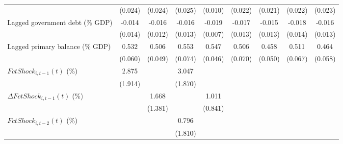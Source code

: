 {\begin{tabular}{l*{8}{c}}
                    &     (0.024)         &     (0.024)         &     (0.025)         &     (0.010)         &     (0.022)         &     (0.021)         &     (0.022)         &     (0.023)         \\
\addlinespace
Lagged government debt (\% GDP)&      -0.014         &      -0.016         &      -0.016         &      -0.019\sym{**} &      -0.017         &      -0.015         &      -0.018         &      -0.016         \\
                    &     (0.014)         &     (0.012)         &     (0.013)         &     (0.007)         &     (0.013)         &     (0.013)         &     (0.014)         &     (0.013)         \\
\addlinespace
Lagged primary balance (\% GDP)&       0.532\sym{***}&       0.506\sym{***}&       0.553\sym{***}&       0.547\sym{***}&       0.506\sym{***}&       0.458\sym{***}&       0.511\sym{***}&       0.464\sym{***}\\
                    &     (0.060)         &     (0.049)         &     (0.074)         &     (0.046)         &     (0.070)         &     (0.050)         &     (0.067)         &     (0.058)         \\
\addlinespace
$ FctShock_{i,t-1}(t)$ (\%)&       2.875         &                     &       3.047         &                     &                     &                     &                     &                     \\
                    &     (1.914)         &                     &     (1.870)         &                     &                     &                     &                     &                     \\
\addlinespace
$ \Delta FctShock_{i,t-1}(t)$ (\%)&                     &       1.668         &                     &       1.011         &                     &                     &                     &                     \\
                    &                     &     (1.381)         &                     &     (0.841)         &                     &                     &                     &                     \\
\addlinespace
$ FctShock_{i,t-2}(t)$ (\%)&                     &                     &       0.796         &                     &                     &                     &                     &                     \\
                    &                     &                     &     (1.810)         &                     &                     &                     &                     &                     \\

\end{tabular}}
